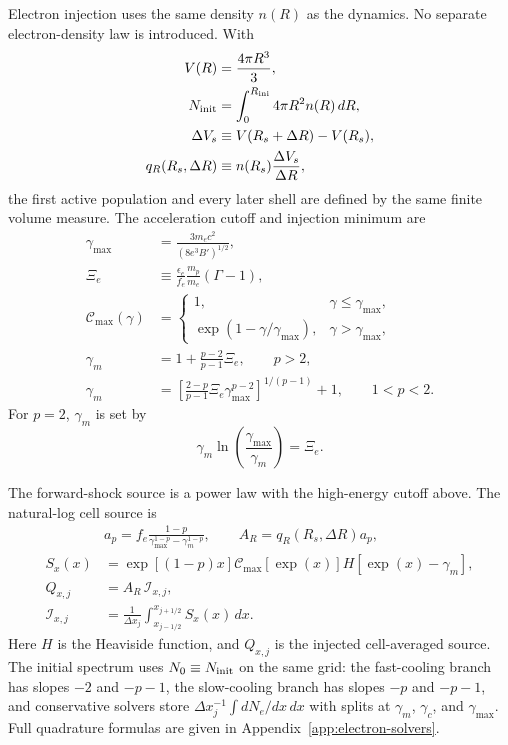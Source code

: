 \documentclass[twocolumn]{aastex702}
\begin{document}
Electron injection uses the same density \(n(R)\) as the dynamics.  No separate
electron-density law is introduced.  With
\begin{equation}
\begin{aligned}
V(R)&=\frac{4\pi R^3}{3},\\
N_{\rm init}&=\int_0^{R_{\rm ini}}4\pi R^2 n(R)\,dR,\\
\Delta V_s&\equiv V(R_s+\Delta R)-V(R_s),\\
q_R(R_s,\Delta R)&\equiv n(R_s)\frac{\Delta V_s}{\Delta R},
\end{aligned}
\end{equation}
the first active population and every later shell are defined by the same finite
volume measure.  The acceleration cutoff and injection minimum are
\begin{equation}
\begin{aligned}
\gamma_{\max}&=\frac{3m_ec^2}{\left(8e^3B'\right)^{1/2}},\\
\Xi_e&\equiv\frac{\epsilon_e}{f_e}\frac{m_p}{m_e}(\Gamma-1),\\
\mathcal{C}_{\max}(\gamma)&=
\begin{cases}
1, & \gamma\le\gamma_{\max},\\
\exp(1-\gamma/\gamma_{\max}), & \gamma>\gamma_{\max},
\end{cases}\\
\gamma_m&=1+\frac{p-2}{p-1}\Xi_e,\qquad p>2,\\
\gamma_m&=
\left[\frac{2-p}{p-1}\Xi_e\gamma_{\max}^{p-2}\right]^{1/(p-1)}+1,
\qquad 1<p<2.
\end{aligned}
\end{equation}
For \(p=2\), \(\gamma_m\) is set by
\begin{equation}
\gamma_m\ln\left(\frac{\gamma_{\max}}{\gamma_m}\right)=\Xi_e .
\end{equation}

The forward-shock source is a power law with the high-energy cutoff above.  The
natural-log cell source is
\begin{equation}
\begin{aligned}
&a_p=f_e\frac{1-p}{\gamma_{\max}^{1-p}-\gamma_m^{1-p}},
\qquad A_R=q_R(R_s,\Delta R)a_p,\\
S_x(x)
&=\exp[(1-p)x]
\mathcal{C}_{\max}[\exp(x)]H[\exp(x)-\gamma_m],\\
Q_{x,j}
&=A_R\,\mathcal I_{x,j},\\
\mathcal I_{x,j}
&=\frac{1}{\Delta x_j}
\int_{x_{j-1/2}}^{x_{j+1/2}}
S_x(x)\,dx .
\end{aligned}
\end{equation}
Here \(H\) is the Heaviside function, and \(Q_{x,j}\) is the injected
cell-averaged source.  The initial spectrum uses \(N_0\equiv N_{\rm init}\) on
the same grid: the fast-cooling branch has slopes \(-2\) and \(-p-1\), the
slow-cooling branch has slopes \(-p\) and \(-p-1\), and conservative solvers store
\(\Delta x_j^{-1}\int dN_e/dx\,dx\) with splits at
\(\gamma_m\), \(\gamma_c\), and \(\gamma_{\max}\).  Full quadrature formulas are
given in Appendix~\ref{app:electron-solvers}.
\end{document}
